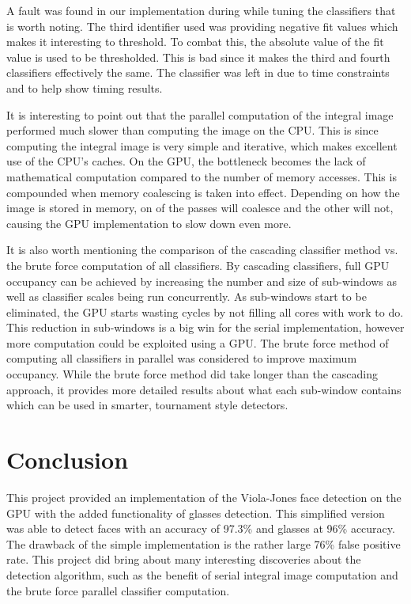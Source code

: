\documentclass[12pt] {article}
\begin{document}
A fault was found in our implementation during while tuning the classifiers that is worth noting. The third identifier used was providing negative fit values which makes it interesting to threshold. To combat this, the absolute value of the fit value is used to be thresholded. This is bad since it makes the third and fourth classifiers effectively the same. The classifier was left in due to time constraints and to help show timing results. 

It is interesting to point out that the parallel computation of the integral image performed much slower than computing the image on the CPU. This is since computing the integral image is very simple and iterative, which makes excellent use of the CPU's caches. On the GPU, the bottleneck becomes the lack of mathematical computation compared to the number of memory accesses. This is compounded when memory coalescing is taken into effect. Depending on how the image is stored in memory, on of the passes will coalesce and the other will not, causing the GPU implementation to slow down even more.

It is also worth mentioning the comparison of the cascading classifier method vs. the brute force computation of all classifiers. By cascading classifiers, full GPU occupancy can be achieved by increasing the number and size of sub-windows as well as classifier scales being run concurrently. As sub-windows start to be eliminated, the GPU starts wasting cycles by not filling all cores with work to do. This reduction in sub-windows is a big win for the serial implementation, however more computation could be exploited using a GPU. The brute force method of computing all classifiers in parallel was considered to improve maximum occupancy. While the brute force method did take longer than the cascading approach, it provides more detailed results about what each sub-window contains which can be used in smarter, tournament style detectors. 

\section{Conclusion}
This project provided an implementation of the Viola-Jones face detection on the GPU with the added functionality of glasses detection. This simplified version was able to detect faces with an accuracy of 97.3\% and glasses at 96\% accuracy. The drawback of the simple implementation is the rather large 76\% false positive rate. This project did bring about many interesting discoveries about the detection algorithm, such as the benefit of serial integral image computation and the brute force parallel classifier computation.
\end{document}
